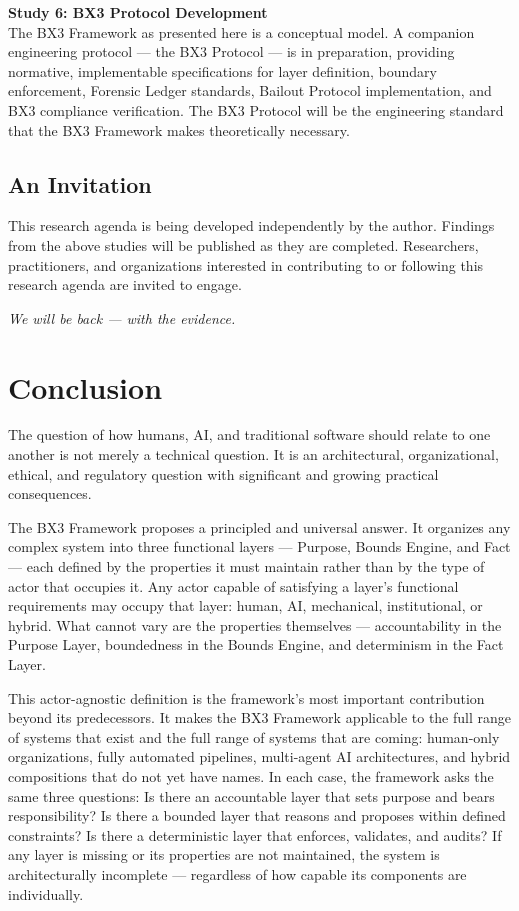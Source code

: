 \documentclass[12pt]{article}
\begin{document}
\textbf{Study 6: BX3 Protocol Development}\\
The BX3 Framework as presented here is a conceptual model. A companion engineering protocol --- the BX3 Protocol --- is in preparation, providing normative, implementable specifications for layer definition, boundary enforcement, Forensic Ledger standards, Bailout Protocol implementation, and BX3 compliance verification. The BX3 Protocol will be the engineering standard that the BX3 Framework makes theoretically necessary.

\subsection{An Invitation}

This research agenda is being developed independently by the author. Findings from the above studies will be published as they are completed. Researchers, practitioners, and organizations interested in contributing to or following this research agenda are invited to engage.

\vspace{0.5em}
\noindent\textit{We will be back --- with the evidence.}

\section{Conclusion}
\label{sec:conclusion}

The question of how humans, AI, and traditional software should relate to one another is not merely a technical question. It is an architectural, organizational, ethical, and regulatory question with significant and growing practical consequences.

The BX3 Framework proposes a principled and universal answer. It organizes any complex system into three functional layers --- Purpose, Bounds Engine, and Fact --- each defined by the properties it must maintain rather than by the type of actor that occupies it. Any actor capable of satisfying a layer's functional requirements may occupy that layer: human, AI, mechanical, institutional, or hybrid. What cannot vary are the properties themselves --- accountability in the Purpose Layer, boundedness in the Bounds Engine, and determinism in the Fact Layer.

This actor-agnostic definition is the framework's most important contribution beyond its predecessors. It makes the BX3 Framework applicable to the full range of systems that exist and the full range of systems that are coming: human-only organizations, fully automated pipelines, multi-agent AI architectures, and hybrid compositions that do not yet have names. In each case, the framework asks the same three questions: Is there an accountable layer that sets purpose and bears responsibility? Is there a bounded layer that reasons and proposes within defined constraints? Is there a deterministic layer that enforces, validates, and audits? If any layer is missing or its properties are not maintained, the system is architecturally incomplete --- regardless of how capable its components are individually.
\end{document}
